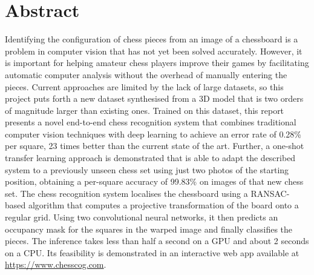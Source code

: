 \documentclass[../report.tex]{subfiles}
\begin{document}
\chapter*{Abstract}

Identifying the configuration of chess pieces from an image of a chessboard is a problem in computer vision that has not yet been solved accurately.
However, it is important for helping amateur chess players improve their games by facilitating automatic computer analysis without the overhead of manually entering the pieces.
Current approaches are limited by the lack of large datasets, so this project puts forth a new dataset synthesised from a 3D model that is two orders of magnitude larger than existing ones.
Trained on this dataset, this report presents a novel end-to-end chess recognition system that combines traditional computer vision techniques with deep learning to achieve an error rate of 0.28\% per square, 23 times better than the current state of the art.
Further, a one-shot transfer learning approach is demonstrated that is able to adapt the described system to a previously unseen chess set using just two photos of the starting position, obtaining a per-square accuracy of 99.83\% on images of that new chess set.
The chess recognition system localises the chessboard using a RANSAC-based algorithm that computes a projective transformation of the board onto a regular grid.
Using two convolutional neural networks, it then predicts an occupancy mask for the squares in the warped image and finally classifies the pieces.
The inference takes less than half a second on a GPU and about 2 seconds on a CPU.
Its feasibility is demonstrated in an interactive web app available at \url{https://www.chesscog.com}.
\end{document}
